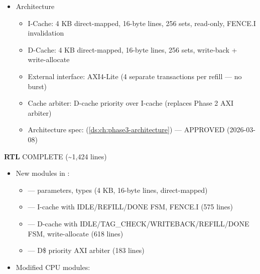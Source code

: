 \begin{record}

\begin{itemize}
\tightlist
\item
  Architecture

  \begin{itemize}
  \tightlist
  \item
    I-Cache: 4 KB direct-mapped, 16-byte lines, 256 sets, read-only,
    FENCE.I invalidation
  \item
    D-Cache: 4 KB direct-mapped, 16-byte lines, 256 sets, write-back +
    write-allocate
  \item
    External interface: AXI4-Lite (4 separate transactions per refill
    --- no burst)
  \item
    Cache arbiter: D-cache priority over I-cache (replaces Phase 2 AXI
    arbiter)
  \item
    Architecture spec:  (\cref{ds:ch:phase3-architecture}) ---
    APPROVED (2026-03-08)
  \end{itemize}
\end{itemize}

\textbf{RTL} \ok{} COMPLETE (\textasciitilde1,424 lines)

\begin{itemize}
\tightlist
\item
  \ok{} New modules in :

  \begin{itemize}
  \tightlist
  \item
    \ok{}  --- parameters, types (4 KB, 16-byte
    lines, direct-mapped)
  \item
    \ok{}  --- I-cache with
    IDLE/\allowbreak{}REFILL/\allowbreak{}DONE FSM, FENCE.I (575 lines)
  \item
    \ok{}  --- D-cache with
    IDLE/\allowbreak{}TAG\_\allowbreak{}CHECK/\allowbreak{}WRITEBACK/\allowbreak{}REFILL/\allowbreak{}DONE
    FSM, write-allocate (618 lines)
  \item
    \ok{}  --- D\$ priority AXI arbiter
    (183 lines)
  \end{itemize}
\item
  \ok{} Modified CPU modules:


\end{itemize}
\end{record}
